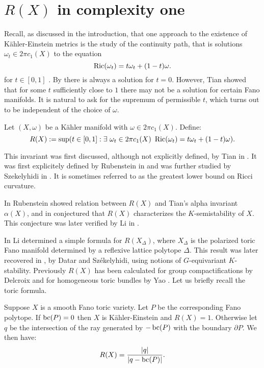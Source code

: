 \chapter{$R(X)$ in complexity one} \label{chap:R(X)}
Recall, as discussed in the introduction, that one approach to the existence of K\"ahler-Einstein metrics is the study of the continuity path, that is solutions \(\omega_t \in 2 \pi c_1(X) \) to the equation
\[
\mathop{\rm Ric}\nolimits(\omega_t) = t\omega_t + (1-t) \omega.
\]
for \(t \in [0,1]\) . By \cite{Yau1977} there is always a solution for \(t = 0\). However, Tian \cite{tian1992stability} showed that for some \(t\) sufficiently close to \(1\) there may not be a solution for certain Fano manifolds. It is natural to ask for the supremum of permissible \(t\), which turns out to be independent of the choice of \(\omega\).
\begin{definition}
Let \((X,\omega)\) be a K\"ahler manifold with \(\omega \in 2 \pi c_1(X)\). Define:
\[
R(X) := \sup ( t \in [0,1]   : \exists \ \omega_t \in 2 \pi c_1(X)  \ \mathop{\rm Ric}\nolimits( \omega_t) = t \omega_t + (1-t) \omega ).
\]
\end{definition}
This invariant was first discussed, although not explicitly defined, by Tian in \cite{Tian87}. It was first explicitely defined by Rubenstein in \cite{rubinstein2008} and was further studied by Szekelyhidi in \cite{szekelyhidi2011}. It is sometimes referred to as the greatest lower bound on Ricci curvature.

In \cite{rubinstein2008} Rubenstein showed relation between \(R(X)\) and Tian's alpha invariant \(\alpha(X)\), and in \cite{rubinstein2009} conjectured that \(R(X)\) characterizes the \(K\)-semistability of \(X\). This conjecture was later verified by Li in \cite{li2017}.

In \cite{li2011} Li  determined a simple formula for \(R(X_\Delta)\), where \(X_\Delta\) is the polarized toric Fano manifold determined by a reflexive lattice polytope \(\Delta\). This result was later recovered in \cite{datar2016kahler}, by Datar and Sz\'ekelyhidi, using notions of \(G\)-equivariant \(K\)-stability. Previously \(R(X)\) has been calculated for group compactifications by Delcroix \cite{delcroix2017} and for homogeneous toric bundles by Yao \cite{yao2017}. Let us briefly recall the toric formula.
\begin{theorem}[Li]
Suppose \(X\) is a smooth Fano toric variety. Let \(P\) be the corresponding Fano polytope. If \(\mathop{\rm bc}\nolimits(P) = 0\) then \(X\) is K\"ahler-Einstein and \(R(X) = 1\). Otherwise let \(q\) be the intersection of the ray generated by \(-\mathop{\rm bc}\nolimits(P)\) with the boundary \(\partial P\). We then have:
\[
R(X) = \frac{|q|}{|q-\mathop{\rm bc}\nolimits(P)|}.
\]
\end{theorem}

